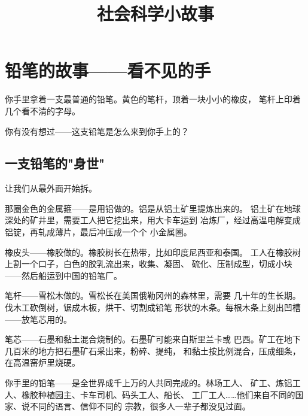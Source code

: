 \documentclass[a4paper,12pt]{ctexart}
\title{\textcolor{blue!70!black}{\Huge\textbf{社会科学小故事}}}
\author{}
\date{}
\begin{document}
\maketitle
\thispagestyle{empty}

\newpage

\section{铅笔的故事——看不见的手}

你手里拿着一支最普通的铅笔。黄色的笔杆，顶着一块小小的橡皮，
笔杆上印着几个看不清的字母。

你有没有想过——这支铅笔是怎么来到你手上的？

\subsection{一支铅笔的"身世"}

让我们从最外面开始拆。

那圈金色的金属箍——是用铝做的。铝是从铝土矿里提炼出来的。
铝土矿在地球深处的矿井里，需要工人把它挖出来，用大卡车运到
冶炼厂，经过高温电解变成铝锭，再轧成薄片，最后冲压成一个个
小金属圈。

橡皮头——橡胶做的。橡胶树长在热带，比如印度尼西亚和泰国。
工人在橡胶树上割一个口子，白色的胶乳流出来，收集、凝固、
硫化、压制成型，切成小块——然后船运到中国的铅笔厂。

笔杆——雪松木做的。雪松长在美国俄勒冈州的森林里，需要
几十年的生长期。伐木工砍倒树，锯成木板，烘干、切割成铅笔
形状的木条。每根木条上刻出凹槽——放笔芯用的。

笔芯——石墨和黏土混合烧制的。石墨矿可能来自斯里兰卡或
巴西。矿工在地下几百米的地方把石墨矿石采出来，粉碎、提纯，
和黏土按比例混合，压成细条，在高温窑炉里烧硬。

你手里的铅笔——是全世界成千上万的人共同完成的。林场工人、
矿工、炼铝工人、橡胶种植园主、卡车司机、码头工人、船长、
工厂工人……他们来自不同的国家、说不同的语言、信仰不同的
宗教，很多人一辈子都没见过面。

\begin{center}
\end{center}
\end{document}
